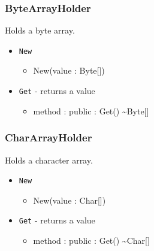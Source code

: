 \documentclass[11pt]{article}
\begin{document}
\subsubsection{ByteArrayHolder}
Holds a byte array.
\begin{itemize}
\item \texttt{New}
  \begin{itemize}
  \item New(value : Byte[])
  \end{itemize}
\item \texttt{Get} - returns a value
  \begin{itemize}
  \item method : public : Get() \textasciitilde Byte[]
  \end{itemize}
\end{itemize}

\subsubsection{CharArrayHolder}
Holds a character array.
\begin{itemize}
\item \texttt{New}
  \begin{itemize}
  \item New(value : Char[])
  \end{itemize}
\item \texttt{Get} - returns a value
  \begin{itemize}
  \item method : public : Get() \textasciitilde Char[]
  \end{itemize}
\end{itemize}
\end{document}
